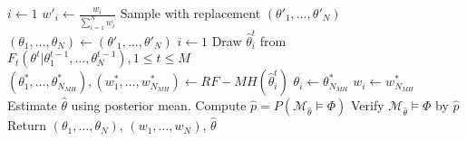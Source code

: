 \begin{algorithm}[H]
\begin{algorithmic}[1]
        \State $i \leftarrow 1$ 
        \State $w'_i \leftarrow \frac{w_i}{\sum_{i=1}^N w_i} $
        \EndWhile
        \State Sample with replacement $(\theta'_1,\ldots,\theta'_N)$ 
        \State $(\theta_1,\ldots,\theta_N) \leftarrow (\theta'_1,\ldots,\theta'_N)$
        \State $i \leftarrow 1$
         
        \State Draw $\hat{\theta}^t_i$ from $F_t(\theta^t | \theta^{t-1}_1,\ldots,\theta^{t-1}_N), 1\leq t \leq M$
        \State $(\theta^*_1,\ldots,\theta^*_{N_{MH}}), (w^*_1,\ldots,w^*_{N_{MH}}) \leftarrow RF-MH(\hat{\theta}^t_i)$
        \State $\theta_i \leftarrow \theta^*_{N_{MH}}$
        \State $w_i \leftarrow w^*_{N_{MH}}$
        \EndWhile
        \EndWhile
        \State Estimate $\hat{\theta}$ using posterior mean.
        \State Compute $\hat{p}=P(\mathcal{M}_{\hat{\theta}} \models\Phi)$
        \State Verify $\mathcal{M}_{\hat{\theta}} \models\Phi$ by $\hat{p}$
        \State Return $(\theta_1,\ldots,\theta_{N})$, $(w_1,\ldots,w_{N})$, $\hat{\theta}$
        \EndProcedure
    \end{algorithmic}
\end{algorithm}

